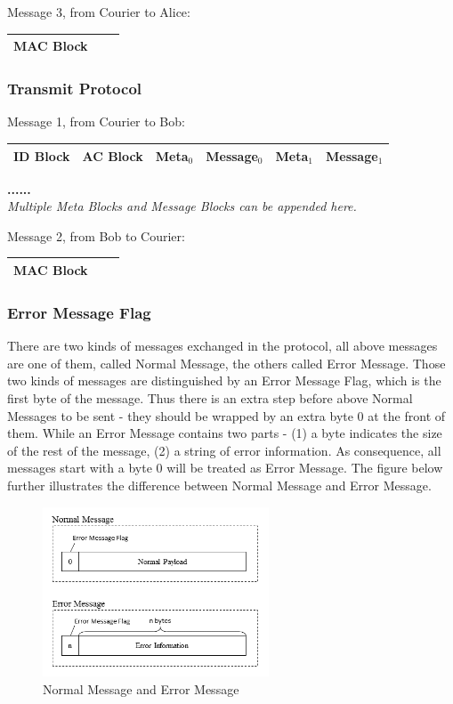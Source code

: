 \noindent
Message 3, from Courier to Alice: \\\bigskip
\begin{tabular}{|c|c|c|}
 \hline
 MAC Block \\ \hline
\end{tabular}

\subsubsection*{Transmit Protocol}
Message 1, from Courier to Bob: \\
\begin{tabular}{|c|c|c|c|c|c|}
 \hline
 ID Block & \qquad\; AC Block \qquad\; & 
 \; Meta$_0$ \; & Message$_0$ & 
 \; Meta$_1$ \; & Message$_1$
 \\ \hline
\end{tabular}
\textbf{......} \\
\noindent\bigskip
\textit{Multiple Meta Blocks and Message Blocks can be appended here.}

\noindent
Message 2, from Bob to Courier: \\\bigskip
\begin{tabular}{|c|c|c|}
 \hline
 MAC Block \\ \hline
\end{tabular}

\subsubsection*{Error Message Flag}
There are two kinds of messages exchanged in the protocol, all above messages are one of them, called Normal Message, the others called Error Message. Those two kinds of messages are distinguished by an Error Message Flag, which is the first byte of the message. Thus there is an extra step before above Normal Messages to be sent - they should be wrapped by an extra byte 0 at the front of them. While an Error Message contains two parts - (1) a byte indicates the size of the rest of the message, (2) a string of error information. As consequence, all messages start with a byte 0 will be treated as Error Message. The figure below further illustrates the difference between Normal Message and Error Message.

\begin{figure}[h!]
\centering
\includegraphics[width=0.6\textwidth,natwidth=469,natheight=351]{figures/normalvserrormessage.png}
\caption{Normal Message and Error Message}
\end{figure}

